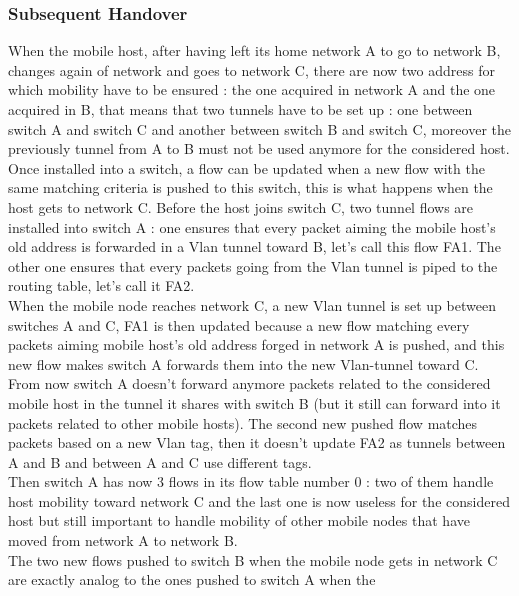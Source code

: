 \documentclass{article}
\begin{document}
\subsubsection{Subsequent Handover}

When the mobile host, after having left its home network A to go to
network B, changes again of network and goes to network C, there are
now two address for which mobility have to be ensured : the one
acquired in network A and the one acquired in B, that means that two
tunnels have to be set up : one between switch A and switch C and
another between switch B and switch C, moreover the previously tunnel
from A to B must not be used anymore for the considered host.\\
\newline
 Once installed into a switch, a flow can be updated when a new flow
with the same matching criteria is pushed to this switch, this is
what happens when the host gets to network C. Before the host joins
switch C, two tunnel flows are installed into switch A : one ensures
that every packet aiming the mobile host's old address is forwarded in
a Vlan tunnel toward B, let's call this flow FA1. The other one
ensures that every packets going from the Vlan tunnel is piped to the
routing table, let's call it FA2.\\
\newline
When the mobile node reaches network C, a new Vlan tunnel is set up
between switches A and C, FA1 is then updated because a new flow
matching every packets aiming mobile host's old address forged in
network A is pushed, and this new flow makes switch A forwards them
into the new Vlan-tunnel toward C. From now switch A doesn't forward
anymore packets related to the considered mobile host in the tunnel
it shares with switch B (but it still can forward into it packets
related to other mobile hosts). The second new pushed flow matches
packets based on a new Vlan tag, then it doesn't update FA2 as tunnels
between A and B and between A and C use different tags. \\
\newline
Then switch A has now 3 flows in its flow table number 0 : two of them
handle host mobility toward network C and the last one is now useless
for the considered host but still important to handle mobility of
other mobile nodes that have moved from network A to network B.\\
\newline
The two new flows pushed to switch B when the mobile node gets in
network C are exactly analog to the ones pushed to switch A when the
\end{document}
